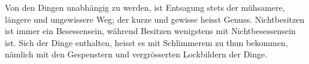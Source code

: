Von den Dingen unabhängig zu werden, ist Entsagung stets der mühsamere, längere und ungewissere Weg; der kurze und gewisse heisst Genuss. Nichtbesitzen ist immer ein Besessensein, während Besitzen wenigstens mit Nichtbesessensein  ist. Sich der Dinge enthalten, heisst es mit Schlimmerem zu thun bekommen, nämlich mit den Gespenstern und vergrösserten Lockbildern der Dinge.
\par

